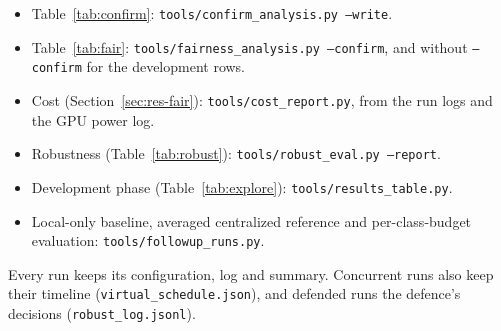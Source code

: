 \documentclass[pdflatex,sn-mathphys-num]{sn-jnl}
\begin{document}
\begin{appendices}
\begin{itemize}
\item Table~\ref{tab:confirm}: \texttt{tools/confirm\_analysis.py --write}.
\item Table~\ref{tab:fair}: \texttt{tools/fairness\_analysis.py --confirm}, and without \texttt{--confirm} for the development rows.
\item Cost (Section~\ref{sec:res-fair}): \texttt{tools/cost\_report.py}, from the run logs and the GPU power log.
\item Robustness (Table~\ref{tab:robust}): \texttt{tools/robust\_eval.py --report}.
\item Development phase (Table~\ref{tab:explore}): \texttt{tools/results\_table.py}.
\item Local-only baseline, averaged centralized reference and per-class-budget evaluation: \texttt{tools/followup\_runs.py}.
\end{itemize}
Every run keeps its configuration, log and summary. Concurrent runs also keep their timeline (\texttt{virtual\_schedule.json}), and defended runs the defence's decisions (\texttt{robust\_log.jsonl}).

\end{appendices}


\end{document}
